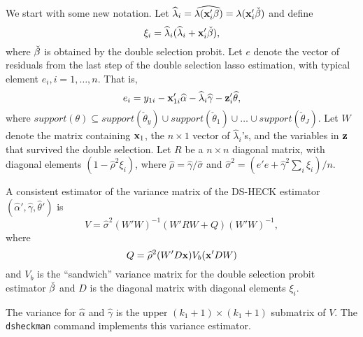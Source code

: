 \documentclass[11pt]{article}
\begin{document}
We start with some new notation. Let $\widehat{\lambda}_i = \widehat{\lambda(\mathbf{x}_i'{\mathbf{\beta}})}=\lambda(\mathbf{x}_i'\check{\mathbf{\beta}})$ and define 
\[	\xi_i = \widehat{\lambda}_i(\widehat{\lambda}_i + \mathbf{x}_i' \check{\mathbf{\beta}}),
\]
where $\check{\mathbf{\beta}}$ is obtained by the double selection probit. %
Let $e$ denote the vector of residuals from the last step of the double selection lasso estimation, with typical element $e_i, i=1, \ldots, n$. That is, %
\[e_i = y_{1i} - \mathbf{x}_{1i}'\widehat{\alpha} - \widehat\lambda_i \widehat{\gamma} -
	{\mathbf{z}}_i'\widehat{\theta},\]
where $support(\theta) \subseteq support(\check{\theta}_y) \cup 
	support(\check{\theta}_1)
	\cup
	\ldots \cup
	support(\check{\theta}_J)
$. Let $W$ denote the matrix containing $\mathbf{x}_1$, the $n\times 1$ vector of $\hat{\lambda}_i$'s, and the variables in $\mathbf{z}$ that survived the double selection. Let $R$ be a $n\times n$ diagonal matrix, with diagonal elements $(1- \hat{\rho}^2\xi_i)$, where 
$\hat{\rho} = \widehat{\gamma}/\widehat{\sigma}$ and 
 $\hat{\sigma}^2 = (e'e + \widehat{\gamma}^2\sum_i \xi_i)/n$.

\begin{prop}\label{prop:var}
A consistent estimator of the variance matrix of the DS-HECK estimator $	(\widehat{\alpha}', \widehat{\gamma}, \widehat{\theta}')$ is 	$$
		V = \hat{\sigma}^2 (W'W)^{-1}(W'RW + Q )(W'W)^{-1},
	$$	where $$
	Q = \widehat{\rho}^2 (W' D \mathbf{x}) V_b (\mathbf{x}'D W)
	$$
	and $V_b$ is the ``sandwich'' variance matrix for the double selection probit estimator $\check{\mathbf{\beta}}$ and $D$ is the diagonal matrix with diagonal elements $\xi_i$.
\end{prop}


 The variance for $\widehat{\alpha}$ and $\widehat{\gamma}$ is the
	upper $(k_1+1)\times(k_1+1)$ submatrix of $V$. The {\tt dsheckman} command implements this variance estimator.
\end{document}
